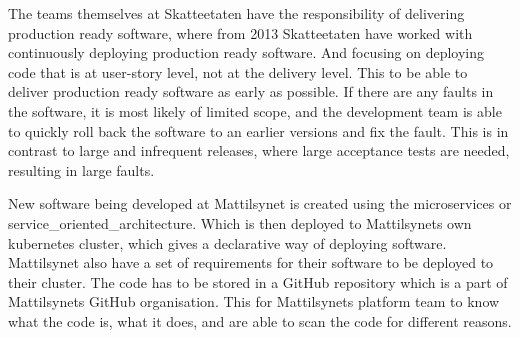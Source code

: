 The teams themselves at Skatteetaten have the responsibility of delivering production ready software, where from 2013 Skatteetaten have worked with continuously deploying production ready software. And focusing on deploying code that is at user-story level, not at the delivery level. This to be able to deliver production ready software as early as possible. If there are any faults in the software, it is most likely of limited scope, and the development team is able to quickly roll back the software to an earlier versions and fix the fault. This is in contrast to large and infrequent releases, where large acceptance tests are needed, resulting in large faults.

New software being developed at Mattilsynet is created using the \gls{microservices} or \gls{service_oriented_architecture}. Which is then deployed to Mattilsynets own \gls{kubernetes} cluster, which gives a declarative way of deploying software. Mattilsynet also have a set of requirements for their software to be deployed to their cluster. The code has to be stored in a GitHub repository which is a part of Mattilsynets GitHub organisation. This for Mattilsynets platform team to know what the code is, what it does, and are able to scan the code for different reasons.



